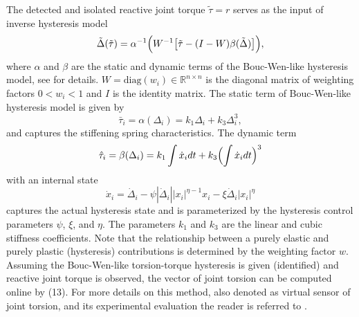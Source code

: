 \documentclass[a4paper, 10pt, conference]{ieeeconf}
\begin{document}
The detected and isolated reactive joint torque $\tilde{\tau} = r$
serves as the input of inverse hysteresis model
\begin{equation}\label{5}
\tilde{\Delta} (\tilde{\tau}) = \alpha ^{-1} \Bigl( W^{-1}
\bigl[\tilde{\tau} - (I - W)\beta (\tilde{\Delta})\bigr]\Bigr),
\end{equation}
where $\alpha$ and $\beta$ are the static and dynamic terms of the
Bouc-Wen-like hysteresis model, see \cite{Rud12a,Ruderman2014b}
for details. $W = \mathrm{diag}(w_i) \in \mathbb{R}^{n \times n}$
is the diagonal matrix of weighting factors $0 < w _{i} < 1$ and
$I$ is the identity matrix. The static term of Bouc-Wen-like
hysteresis model is given by
\begin{equation}\label{6}
\bar{\tau}_i = \alpha (\Delta_i) = k_{1} \Delta_i + k_{3}
\Delta_i^{3},
\end{equation}
and captures the stiffening spring characteristics. The dynamic
term
\begin{equation}\label{7}
\hat{\tau}_i = \beta(\Delta_i) = k_{1} \int \dot{x}_i dt + k_{3}
\Bigl(\int \dot{x}_i dt\Bigr)^{3}
\end{equation}
with an internal state
\begin{equation}\label{8}
\dot{x}_i = \dot{\Delta}_i - \psi |\dot{\Delta}_i| |x_i|^{\eta-1}
x_i -\xi \dot{\Delta}_i |x_i|^{\eta}
\end{equation}
captures the actual hysteresis state and is parameterized by the
hysteresis control parameters $\psi$, $\xi$, and $\eta$. The
parameters $k_{1}$ and $k_{3}$ are the linear and cubic stiffness
coefficients. Note that the relationship between a purely elastic
and purely plastic (hysteresis) contributions is determined by the
weighting factor $w$. Assuming the Bouc-Wen-like torsion-torque
hysteresis is given (identified) and reactive joint torque is
observed, the vector of joint torsion can be computed online by
(13). For more details on this method, also denoted as virtual
sensor of joint torsion, and its experimental evaluation the
reader is referred to \cite{Ruderman2014b,Ruderman2014c}.
\end{document}

